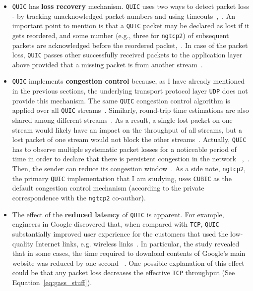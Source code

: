 \documentclass[12pt,a4paper,twoside,openright]{report}
\begin{document}
\begin{itemize}
    
    
    \item  \texttt{QUIC} has \textbf{loss recovery} mechanism.
    \texttt{QUIC} uses two ways to detect packet loss - by tracking unacknowledged packet numbers and using timeouts~\cite{UnderstandQUIC},~\cite[Section~6]{ietf-quic-recovery-32}.
    An important point to mention is that a \texttt{QUIC} packet may be declared as lost if it gets reordered, and some number (e.g., three for \texttt{ngtcp2}) of subsequent packets are acknowledged before the reordered packet,~\cite[Section~6]{ietf-quic-recovery-32}.
    In case of the packet loss, \texttt{QUIC} passes other successfully received packets to the application layer above provided that a missing packet is from another stream~\cite{head-of-line-blocking-in-quic-and-http-3-the-details}.
   
   \item \texttt{QUIC} implements \textbf{congestion control} because, as I have already mentioned in the previous sections, the underlying transport protocol layer \texttt{UDP} does not provide this mechanism. 
   The same \texttt{QUIC} congestion control algorithm is applied over all \texttt{QUIC} streams~\cite{head-of-line-blocking-in-quic-and-http-3-the-details, UnderstandQUIC}.
   Similarly, round-trip time estimations are also shared among different streams~\cite[Section~4.2]{ietf-quic-recovery-32}.
   As a result, a single lost packet on one stream would likely have an impact on the throughput of all streams, but a lost packet of one stream would not block the other streams~\cite{head-of-line-blocking-in-quic-and-http-3-the-details, UnderstandQUIC}.
   Actually, \texttt{QUIC} has to observe multiple systematic packet losses for a noticeable period of time in order to declare that there is persistent congestion in the network ~\cite[Section~4]{ietf-quic-recovery-32},~\cite{UnderstandQUIC}.
   Then, the sender can reduce its congestion window~\cite{UnderstandQUIC}.
   As a side note, \texttt{ngtcp2}, the primary \texttt{QUIC} implementation that I am studying, uses \texttt{CUBIC} as the default congestion control mechanism (according to the private correspondence with the \texttt{ngtcp2} co-author).
  
  

 

  
  
  \item The effect of the \textbf{reduced latency} of \texttt{QUIC} is apparent.
  For example, engineers in Google discovered that, when compared with \texttt{TCP}, \texttt{QUIC} substantially improved user experience for the customers that used the low-quality Internet links, e.g. wireless links~\cite{chromium_blog_about_quic, quic-vs-tcptls-and-why-quic-is-not-the-next-big-thing}.
  In particular, the study revealed that in some cases, the time required to download contents of Google's main website was reduced by one second ~\cite{chromium_blog_about_quic}.
  One possible explanation of this effect could be that any packet loss decreases the effective \texttt{TCP} throughput (See Equation~\ref{eq:gass_stuff}).
  

\end{itemize}
\end{document}
